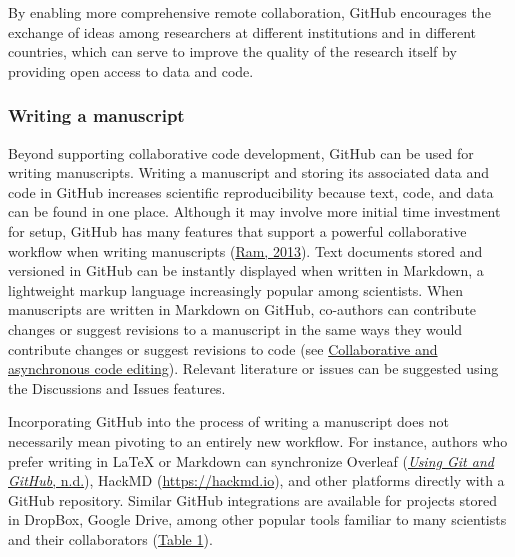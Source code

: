 By enabling more comprehensive remote collaboration, GitHub encourages the exchange of ideas among researchers at different institutions and in different countries, which can serve to improve the quality of the research itself by providing open access to data and code.

\hypertarget{writing-manuscript}{%
\subsubsection{Writing a manuscript}\label{writing-manuscript}}

Beyond supporting collaborative code development, GitHub can be used for writing manuscripts.
Writing a manuscript and storing its associated data and code in GitHub increases scientific reproducibility because text, code, and data can be found in one place.
Although it may involve more initial time investment for setup, GitHub has many features that support a powerful collaborative workflow when writing manuscripts (\protect\hyperlink{ref-4ny1onB0}{Ram, 2013}).
Text documents stored and versioned in GitHub can be instantly displayed when written in Markdown, a lightweight markup language increasingly popular among scientists.
When manuscripts are written in Markdown on GitHub, co-authors can contribute changes or suggest revisions to a manuscript in the same ways they would contribute changes or suggest revisions to code (see \protect\hyperlink{code-editing}{Collaborative and asynchronous code editing}).
Relevant literature or issues can be suggested using the Discussions and Issues features.

Incorporating GitHub into the process of writing a manuscript does not necessarily mean pivoting to an entirely new workflow.
For instance, authors who prefer writing in LaTeX or Markdown can synchronize Overleaf (\protect\hyperlink{ref-oGbKxHzj}{\emph{Using Git and GitHub}, n.d.}), HackMD (\url{https://hackmd.io}), and other platforms directly with a GitHub repository.
Similar GitHub integrations are available for projects stored in DropBox, Google Drive, among other popular tools familiar to many scientists and their collaborators (\protect\hyperlink{tbl:compare}{Table 1}).

